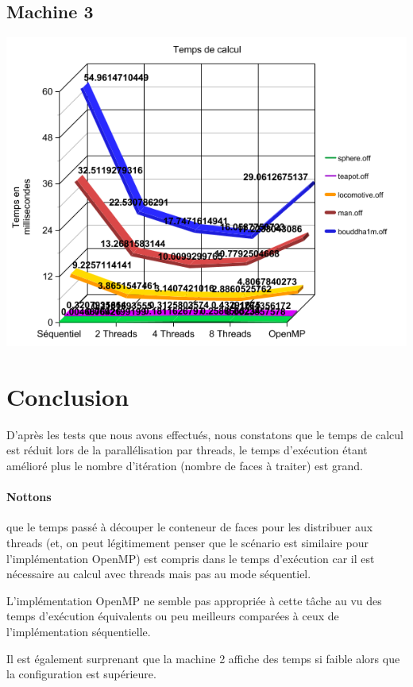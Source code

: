 \documentclass[a4paper]{article}
\begin{document}
	\subsection{Machine 3}
	\begin{center}
		\includegraphics[scale = 0.5]{graph_execTime_machine3.png}
	\end{center}
\section{Conclusion}
D'après les tests que nous avons effectués, nous constatons que le temps de calcul est réduit lors de la parallélisation par threads, le temps d'exécution étant amélioré plus le nombre d'itération (nombre de faces à traiter) est grand.

\paragraph{Nottons} que le temps passé à découper le conteneur de faces pour les distribuer aux threads (et, on peut légitimement penser que le scénario est similaire pour l'implémentation OpenMP) est compris dans le temps d'exécution car il est nécessaire au calcul avec threads mais pas au mode séquentiel.

L'implémentation OpenMP ne semble pas appropriée à cette tâche au vu des temps d'exécution équivalents ou peu meilleurs comparées à ceux de l'implémentation séquentielle.

Il est également surprenant que la machine 2 affiche des temps si faible alors que la configuration est supérieure.

\newpage


\end{document}
